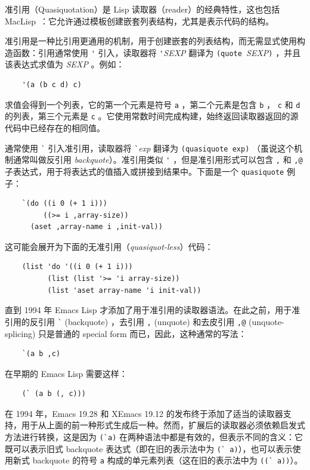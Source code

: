\documentclass[format=acmsmall,screen]{acmart}
\begin{document}
准引用（Quasiquotation）是 Lisp 读取器（reader）的经典特性，这也包括 MacLisp~\cite{Bawden1999}：它允许通过模板创建嵌套列表结构，尤其是表示代码的结构。

准引用是一种比引用更通用的机制，用于创建嵌套的列表结构，而无需显式使用构造函数：引用通常使用 \verb|'| 引入，读取器将 \verb|'|\textsl{SEXP} 翻译为 \texttt{(quote }\textsl{SEXP}\texttt{)} ，并且该表达式求值为 \textsl{SEXP} 。例如：
%
\begin{verbatim}
    '(a (b c d) c)
\end{verbatim}
%

求值会得到一个列表，它的第一个元素是符号 \texttt{a} ，第二个元素是包含 \texttt{b} ， \texttt{c} 和 \texttt{d} 的列表，第三个元素是 \texttt{c} 。它使用常数时间完成构建，始终返回读取器返回的源代码中已经存在的相同值。

通常使用 \verb|`| 引入准引用，读取器将 \verb|`|\textit{exp} 翻译为 \texttt{(quasiquote exp)} （虽说这个机制通常叫做反引用 \textit{backquote}）。准引用类似 \verb|'| ，但是准引用形式可以包含 \texttt{,} 和 \texttt{,@} 子表达式，用于将表达式的值插入或拼接到结果中。下面是一个 \texttt{quasiquote} 例子：
%
\begin{verbatim}
    `(do ((i 0 (+ 1 i)))
         ((>= i ,array-size))
      (aset ,array-name i ,init-val))
\end{verbatim}
%
这可能会展开为下面的无准引用（\textit{quasiquot-less}）代码：
%
\begin{verbatim}
    (list 'do '((i 0 (+ 1 i)))
          (list (list '>= 'i array-size))
          (list 'aset array-name 'i init-val))
\end{verbatim}
%
直到 1994 年 Emacs Lisp 才添加了用于准引用的读取器语法。在此之前，用于准引用的反引用 \verb|`| (backquote) ，去引用 \verb|,| (unquote) 和去皮引用 \verb|,@| (unquote-splicing) 只是普通的 special form 而已，因此，这种通常的写法：
\begin{verbatim}
    `(a b ,c)
\end{verbatim}
在早期的 Emacs Lisp 需要这样：
\begin{verbatim}
    (` (a b (, c)))
\end{verbatim}
在 1994 年，Emacs 19.28 和 XEmacs 19.12 的发布终于添加了适当的读取器支持，用于从上面的前一种形式生成后一种。然而，扩展后的读取器必须依赖启发式方法进行转换，这是因为 \verb|(`a)| 在两种语法中都是有效的，但表示不同的含义：它既可以表示旧式 backquote 表达式（即在旧的表示法中为 \verb|(` a)|），也可以表示使用新式 backquote 的符号 \texttt{a} 构成的单元素列表（这在旧的表示法中为 \verb|((` a))|）。
\end{document}
